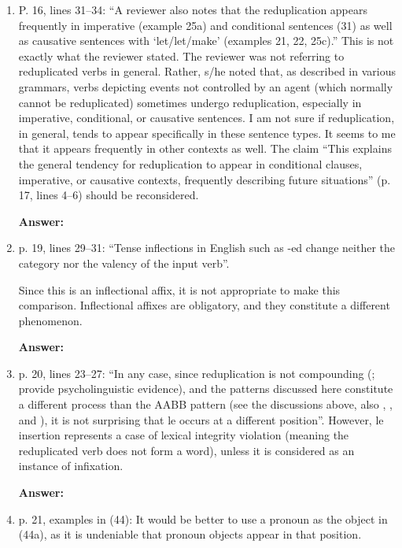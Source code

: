 \documentclass[fleqn,twoside]{article}
\begin{document}
\begin{enumerate}
\item P. 16, lines 31--34: ``A reviewer also notes that the reduplication appears frequently in imperative
(example 25a) and conditional sentences (31) as well as causative sentences with 
`let/let/make' (examples 21, 22, 25c).''
This is not exactly what the reviewer stated. The reviewer was not referring to reduplicated verbs in
general. Rather, s/he noted that, as described in various grammars, verbs depicting events not
controlled by an agent (which normally cannot be reduplicated) sometimes undergo reduplication,
especially in imperative, conditional, or causative sentences. I am not sure if reduplication, in general,
tends to appear specifically in these sentence types. It seems to me that it appears frequently in other
contexts as well. The claim ``This explains the general tendency for reduplication to appear in
conditional clauses, imperative, or causative contexts, frequently describing future situations'' (p. 17,
lines 4--6) should be reconsidered.

\noindent
\textbf{Answer:}

\item p. 19, lines 29--31: ``Tense inflections in English such as -ed change neither the category nor the
valency of the input verb''.

Since this is an inflectional affix, it is not appropriate to make this comparison. Inflectional affixes
are obligatory, and they constitute a different phenomenon.

\noindent
\textbf{Answer:}

\item p. 20, lines 23--27: ``In any case, since reduplication is not compounding (\citealt[149--150]{Sui2018}; \citealt{GaoEtAl2021} provide psycholinguistic evidence), and the patterns discussed here constitute a different
process than the AABB pattern (see the discussions above, also \citealt[Sec. 4.3]{Deng2013}, \citealt[Sec. 2]{SuiHu2016}, \citealt{Sui2018} and \citealt{Wang2023}), it is not surprising that le occurs at a different position''.
However, le insertion represents a case of lexical integrity violation (meaning the reduplicated verb
does not form a word), unless it is considered as an instance of infixation.

\noindent
\textbf{Answer:}

\item p. 21, examples in (44): It would be better to use a pronoun as the object in (44a), as it is undeniable
that pronoun objects appear in that position.


\end{enumerate}
\end{document}
